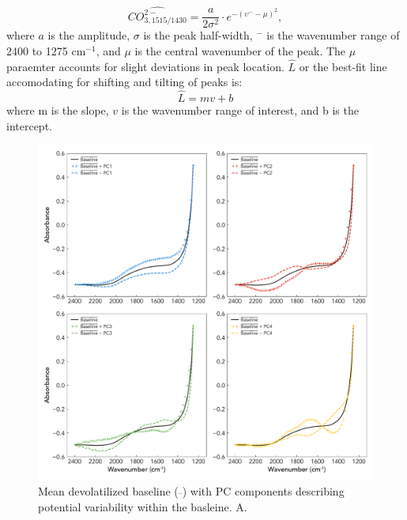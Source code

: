 \documentclass[draft]{agujournal2019}
\begin{document}
\begin{equation}
    \hat{CO_{3, 1515/1430}^{2-}} = \frac{a}{2\sigma^2} \cdot e^{-(\upsilon^- - \mu)^2},
\end{equation}
where $a$ is the amplitude, $\sigma$ is the peak half-width, \textupsilon$^-$ is the wavenumber range of 2400 to 1275 cm$^{-1}$, and $\mu$ is the central wavenumber of the peak. The $\mu$ paraemter accounts for slight deviations in peak location. 
$\hat{L}$ or the best-fit line accomodating for shifting and tilting of peaks is: 
\begin{equation}
    \hat{L} = mv + b 
\end{equation}
where m is the slope, $v$ is the wavenumber range of interest, and b is the intercept. 

\begin{figure}[htb!] 
\centering
\includegraphics[width=1.0\textwidth]{BL+PCVectors_Subplot}
\caption[Mean devolatilized baseline with PC components describing variability]{Mean devolatilized baseline ($\overline{}$) with PC components describing potential variability within the basleine. A. }
\label{figure:BaselinewithPCA}
\end{figure}

\end{document}
